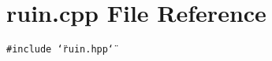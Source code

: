 \section{ruin.cpp File Reference}
\label{ruin_8cpp}
{\tt \#include \char`\"{}ruin.hpp\char`\"{}}\par
